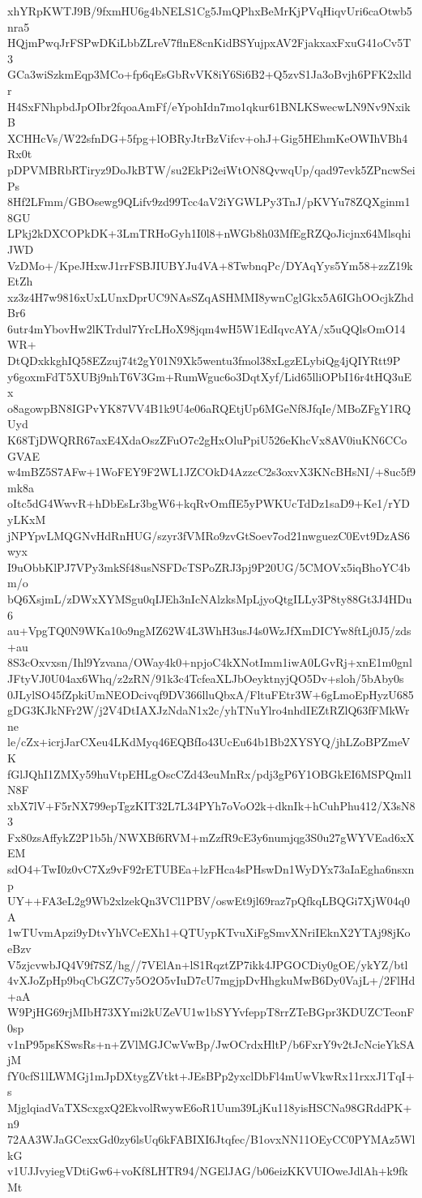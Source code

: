 xhYRpKWTJ9B/9fxmHU6g4bNELS1Cg5JmQPhxBeMrKjPVqHiqvUri6caOtwb5nra5
HQjmPwqJrFSPwDKiLbbZLreV7flnE8cnKidBSYujpxAV2FjakxaxFxuG41oCv5T3
GCa3wiSzkmEqp3MCo+fp6qEsGbRvVK8iY6Si6B2+Q5zvS1Ja3oBvjh6PFK2xlldr
H4SxFNhpbdJpOIbr2fqoaAmFf/eYpohIdn7mo1qkur61BNLKSwecwLN9Nv9NxikB
XCHHcVs/W22sfnDG+5fpg+lOBRyJtrBzVifcv+ohJ+Gig5HEhmKeOWIhVBh4Rx0t
pDPVMBRbRTiryz9DoJkBTW/su2EkPi2eiWtON8QvwqUp/qad97evk5ZPncwSeiPs
8Hf2LFmm/GBOsewg9QLifv9zd99Tcc4aV2iYGWLPy3TnJ/pKVYu78ZQXginm18GU
LPkj2kDXCOPkDK+3LmTRHoGyh1I0l8+nWGb8h03MfEgRZQoJicjnx64MlsqhiJWD
VzDMo+/KpeJHxwJ1rrFSBJIUBYJu4VA+8TwbnqPc/DYAqYys5Ym58+zzZ19kEtZh
xz3z4H7w9816xUxLUnxDprUC9NAsSZqASHMMI8ywnCglGkx5A6IGhOOcjkZhdBr6
6utr4mYbovHw2lKTrdul7YrcLHoX98jqm4wH5W1EdIqvcAYA/x5uQQlsOmO14WR+
DtQDxkkghIQ58EZzuj74t2gY01N9Xk5wentu3fmol38xLgzELybiQg4jQIYRtt9P
y6goxmFdT5XUBj9nhT6V3Gm+RumWguc6o3DqtXyf/Lid65lliOPbI16r4tHQ3uEx
o8agowpBN8IGPvYK87VV4B1k9U4e06aRQEtjUp6MGeNf8JfqIe/MBoZFgY1RQUyd
K68TjDWQRR67axE4XdaOszZFuO7c2gHxOluPpiU526eKhcVx8AV0iuKN6CCoGVAE
w4mBZ5S7AFw+1WoFEY9F2WL1JZCOkD4AzzcC2s3oxvX3KNcBHsNI/+8uc5f9mk8a
oItc5dG4WwvR+hDbEsLr3bgW6+kqRvOmfIE5yPWKUcTdDz1saD9+Ke1/rYDyLKxM
jNPYpvLMQGNvHdRnHUG/szyr3fVMRo9zvGtSoev7od21nwguezC0Evt9DzAS6wyx
I9uObbKlPJ7VPy3mkSf48usNSFDcTSPoZRJ3pj9P20UG/5CMOVx5iqBhoYC4bm/o
bQ6XsjmL/zDWxXYMSgu0qIJEh3nIcNAlzksMpLjyoQtgILLy3P8ty88Gt3J4HDu6
au+VpgTQ0N9WKa10o9ngMZ62W4L3WhH3usJ4s0WzJfXmDICYw8ftLj0J5/zds+au
8S3cOxvxsn/Ihl9Yzvana/OWay4k0+npjoC4kXNotImm1iwA0LGvRj+xnE1m0gnl
JFtyVJ0U04ax6Whq/z2zRN/91k3c4TcfeaXLJbOeyktnyjQO5Dv+sloh/5bAby0s
0JLylSO45fZpkiUmNEODcivqf9DV366lluQbxA/FltuFEtr3W+6gLmoEpHyzU685
gDG3KJkNFr2W/j2V4DtIAXJzNdaN1x2c/yhTNuYlro4nhdIEZtRZlQ63fFMkWrne
le/cZx+icrjJarCXeu4LKdMyq46EQBfIo43UcEu64b1Bb2XYSYQ/jhLZoBPZmeVK
fGlJQhI1ZMXy59huVtpEHLgOscCZd43euMnRx/pdj3gP6Y1OBGkEI6MSPQml1N8F
xbX7lV+F5rNX799epTgzKIT32L7L34PYh7oVoO2k+dknIk+hCuhPhu412/X3sN83
Fx80zsAffykZ2P1b5h/NWXBf6RVM+mZzfR9cE3y6numjqg3S0u27gWYVEad6xXEM
sdO4+TwI0z0vC7Xz9vF92rETUBEa+lzFHca4sPHswDn1WyDYx73aIaEgha6nsxnp
UY++FA3eL2g9Wb2xlzekQn3VCl1PBV/oswEt9jl69raz7pQfkqLBQGi7XjW04q0A
1wTUvmApzi9yDtvYhVCeEXh1+QTUypKTvuXiFgSmvXNriIEknX2YTAj98jKoeBzv
V5zjcvwbJQ4V9f7SZ/hg//7VElAn+lS1RqztZP7ikk4JPGOCDiy0gOE/ykYZ/btl
4vXJoZpHp9bqCbGZC7y5O2O5vIuD7cU7mgjpDvHhgkuMwB6Dy0VajL+/2FlHd+aA
W9PjHG69rjMIbH73XYmi2kUZeVU1w1bSYYvfeppT8rrZTeBGpr3KDUZCTeonF0sp
v1nP95psKSwsRs+n+ZVlMGJCwVwBp/JwOCrdxHltP/b6FxrY9v2tJcNcieYkSAjM
fY0cfS1lLWMGj1mJpDXtygZVtkt+JEsBPp2yxclDbFl4mUwVkwRx11rxxJ1TqI+s
MjglqiadVaTXScxgxQ2EkvolRwywE6oR1Uum39LjKu118yisHSCNa98GRddPK+n9
72AA3WJaGCexxGd0zy6lsUq6kFABIXI6Jtqfec/B1ovxNN11OEyCC0PYMAz5WlkG
v1UJJvyiegVDtiGw6+voKf8LHTR94/NGElJAG/b06eizKKVUIOweJdlAh+k9fkMt
